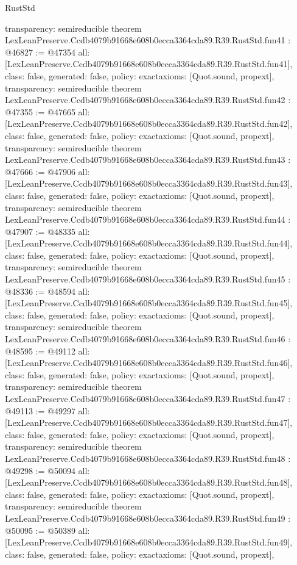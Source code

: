 \begin{lexlean}{RustStd}
\begin{coremodule}
{  transparency: semireducible
}
theorem LexLeanPreserve.Ccdb4079b91668e608b0ecca3364cda89.R39.RustStd.fun41 : @46827 := @47354 {
  all: [LexLeanPreserve.Ccdb4079b91668e608b0ecca3364cda89.R39.RustStd.fun41],
  class: false,
  generated: false,
  policy: exact{axioms: [Quot.sound, propext]},
  transparency: semireducible
}
theorem LexLeanPreserve.Ccdb4079b91668e608b0ecca3364cda89.R39.RustStd.fun42 : @47355 := @47665 {
  all: [LexLeanPreserve.Ccdb4079b91668e608b0ecca3364cda89.R39.RustStd.fun42],
  class: false,
  generated: false,
  policy: exact{axioms: [Quot.sound, propext]},
  transparency: semireducible
}
theorem LexLeanPreserve.Ccdb4079b91668e608b0ecca3364cda89.R39.RustStd.fun43 : @47666 := @47906 {
  all: [LexLeanPreserve.Ccdb4079b91668e608b0ecca3364cda89.R39.RustStd.fun43],
  class: false,
  generated: false,
  policy: exact{axioms: [Quot.sound, propext]},
  transparency: semireducible
}
theorem LexLeanPreserve.Ccdb4079b91668e608b0ecca3364cda89.R39.RustStd.fun44 : @47907 := @48335 {
  all: [LexLeanPreserve.Ccdb4079b91668e608b0ecca3364cda89.R39.RustStd.fun44],
  class: false,
  generated: false,
  policy: exact{axioms: [Quot.sound, propext]},
  transparency: semireducible
}
theorem LexLeanPreserve.Ccdb4079b91668e608b0ecca3364cda89.R39.RustStd.fun45 : @48336 := @48594 {
  all: [LexLeanPreserve.Ccdb4079b91668e608b0ecca3364cda89.R39.RustStd.fun45],
  class: false,
  generated: false,
  policy: exact{axioms: [Quot.sound, propext]},
  transparency: semireducible
}
theorem LexLeanPreserve.Ccdb4079b91668e608b0ecca3364cda89.R39.RustStd.fun46 : @48595 := @49112 {
  all: [LexLeanPreserve.Ccdb4079b91668e608b0ecca3364cda89.R39.RustStd.fun46],
  class: false,
  generated: false,
  policy: exact{axioms: [Quot.sound, propext]},
  transparency: semireducible
}
theorem LexLeanPreserve.Ccdb4079b91668e608b0ecca3364cda89.R39.RustStd.fun47 : @49113 := @49297 {
  all: [LexLeanPreserve.Ccdb4079b91668e608b0ecca3364cda89.R39.RustStd.fun47],
  class: false,
  generated: false,
  policy: exact{axioms: [Quot.sound, propext]},
  transparency: semireducible
}
theorem LexLeanPreserve.Ccdb4079b91668e608b0ecca3364cda89.R39.RustStd.fun48 : @49298 := @50094 {
  all: [LexLeanPreserve.Ccdb4079b91668e608b0ecca3364cda89.R39.RustStd.fun48],
  class: false,
  generated: false,
  policy: exact{axioms: [Quot.sound, propext]},
  transparency: semireducible
}
theorem LexLeanPreserve.Ccdb4079b91668e608b0ecca3364cda89.R39.RustStd.fun49 : @50095 := @50389 {
  all: [LexLeanPreserve.Ccdb4079b91668e608b0ecca3364cda89.R39.RustStd.fun49],
  class: false,
  generated: false,
  policy: exact{axioms: [Quot.sound, propext]},
}
\end{coremodule}
\end{lexlean}
